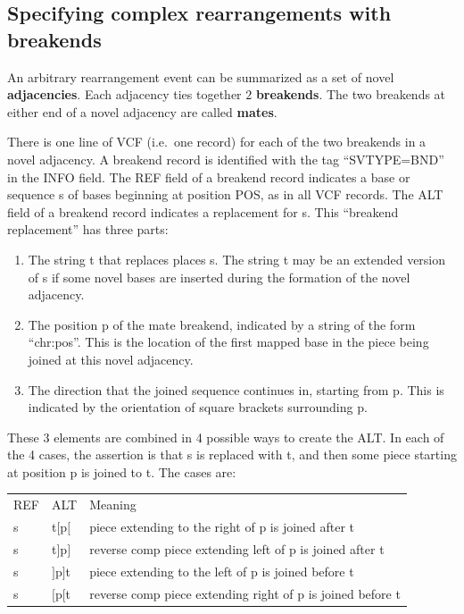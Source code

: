 \documentclass[8pt]{article}
\begin{document}
\subsection{Specifying complex rearrangements with breakends}
\label{Breakends}

An arbitrary rearrangement event can be summarized as a set of novel \textbf{adjacencies}. Each adjacency ties together $2$ \textbf{breakends}.
The two breakends at either end of a novel adjacency are called \textbf{mates}.

There is one line of VCF (i.e.\ one record) for each of the two breakends in a novel adjacency.
A breakend record is identified with the tag ``SVTYPE=BND'' in the INFO field.
The REF field of a breakend record indicates a base or sequence s of bases beginning at position POS, as in all VCF records.
The ALT field of a breakend record indicates a replacement for s.
This ``breakend replacement'' has three parts:
\begin{enumerate}
  \item The string t that replaces places s.
  The string t may be an extended version of s if some novel bases are inserted during the formation of the novel adjacency.
  \item The position p of the mate breakend, indicated by a string of the form ``chr:pos''.
  This is the location of the first mapped base in the piece being joined at this novel adjacency.
  \item The direction that the joined sequence continues in, starting from p.
  This is indicated by the orientation of square brackets surrounding p.

\end{enumerate}
These 3 elements are combined in 4 possible ways to create the ALT.
In each of the 4 cases, the assertion is that s is replaced with t, and then some piece starting at position p is joined to t.
The cases are:

\vspace{0.3cm}
\begin{tabular}{ l l l }
REF & ALT & Meaning \\
s & t$[$p$[$ & piece extending to the right of p is joined after t \\
s & t$]$p$]$ & reverse comp piece extending left of p is joined after t \\
s & $]$p$]$t & piece extending to the left of p is joined before t \\
s & $[$p$[$t & reverse comp piece extending right of p is joined before t \\
\end{tabular}
\vspace{0.3cm}
\end{document}
